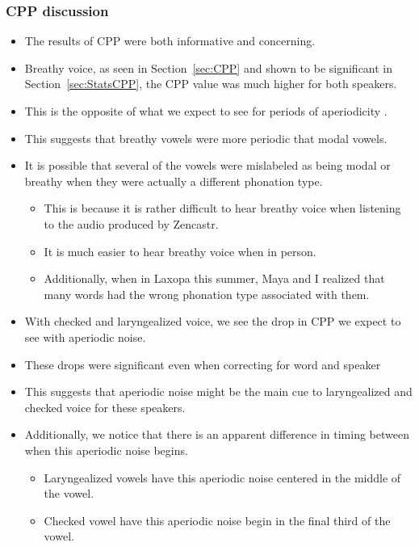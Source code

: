 \documentclass[12pt, letterpaper]{article}
\begin{document}
\subsubsection{CPP discussion} \label{sec:DiscH1H2}
\begin{itemize}
	\item The results of CPP were both informative and concerning. 
	\item Breathy voice, as seen in Section~\ref{sec:CPP} and shown to be significant in Section~\ref{sec:StatsCPP}, the CPP value was much higher for both speakers.
	\item This is the opposite of what we expect to see for periods of aperiodicity \citep{hillenbrandAcousticCorrelatesBreathy1994,hillenbrandAcousticCorrelatesBreathy1996}.
	\item This suggests that breathy vowels were more periodic that modal vowels. 
	\item It is possible that several of the vowels were mislabeled as being modal or breathy when they were actually a different phonation type. 
	\begin{itemize}
		\item This is because it is rather difficult to hear breathy voice when listening to the audio produced by Zencastr. 
		\item It is much easier to hear breathy voice when in person. 
		\item Additionally, when in Laxopa this summer, Maya and I realized that many words had the wrong phonation type associated with them.
	\end{itemize}
	\item With checked and laryngealized voice, we see the drop in CPP we expect to see with aperiodic noise. 
	\item These drops were significant even when correcting for word and speaker
	\item This suggests that aperiodic noise might be the main cue to laryngealized and checked voice for these speakers. 
	\item Additionally, we notice that there is an apparent difference in timing between when this aperiodic noise begins. 
	\begin{itemize}
		\item Laryngealized vowels have this aperiodic noise centered in the middle of the vowel. 
		\item Checked vowel have this aperiodic noise begin in the final third of the vowel. 

\end{itemize}
\end{itemize}
\end{document}
